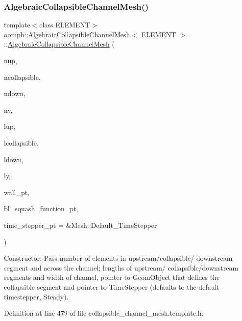 \subsubsection{\texorpdfstring{Algebraic\+Collapsible\+Channel\+Mesh()}{AlgebraicCollapsibleChannelMesh()}\hspace{0.1cm}{\footnotesize\ttfamily [2/2]}}
{\footnotesize\ttfamily template$<$class E\+L\+E\+M\+E\+NT$>$ \\
\hyperlink{classoomph_1_1AlgebraicCollapsibleChannelMesh}{oomph\+::\+Algebraic\+Collapsible\+Channel\+Mesh}$<$ E\+L\+E\+M\+E\+NT $>$\+::\hyperlink{classoomph_1_1AlgebraicCollapsibleChannelMesh}{Algebraic\+Collapsible\+Channel\+Mesh} (\begin{DoxyParamCaption}\item[{const unsigned \&}]{nup,  }\item[{const unsigned \&}]{ncollapsible,  }\item[{const unsigned \&}]{ndown,  }\item[{const unsigned \&}]{ny,  }\item[{const double \&}]{lup,  }\item[{const double \&}]{lcollapsible,  }\item[{const double \&}]{ldown,  }\item[{const double \&}]{ly,  }\item[{Geom\+Object $\ast$}]{wall\+\_\+pt,  }\item[{\hyperlink{classoomph_1_1CollapsibleChannelDomain_a2bf1d7943bfac134a5c27a54c7e1faed}{Collapsible\+Channel\+Domain\+::\+B\+L\+Squash\+Fct\+Pt}}]{bl\+\_\+squash\+\_\+function\+\_\+pt,  }\item[{Time\+Stepper $\ast$}]{time\+\_\+stepper\+\_\+pt = {\ttfamily \&Mesh\+:\+:Default\+\_\+TimeStepper} }\end{DoxyParamCaption})\hspace{0.3cm}{\ttfamily [inline]}}



Constructor\+: Pass number of elements in upstream/collapsible/ downstream segment and across the channel; lengths of upstream/ collapsible/downstream segments and width of channel, pointer to Geom\+Object that defines the collapsible segment and pointer to Time\+Stepper (defaults to the default timestepper, Steady). 



Definition at line 479 of file collapsible\+\_\+channel\+\_\+mesh.\+template.\+h.



